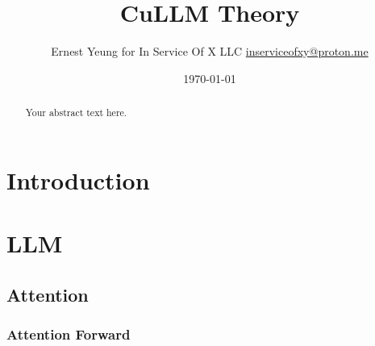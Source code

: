 \documentclass[10pt]{amsart}
\title[CuLLM Theory]{CuLLM Theory}
\author{Ernest Yeung for In Service Of X LLC \href{mailto:inserviceofxy@proton.me}{inserviceofxy@proton.me}}
\date{\today}
\begin{document}

\maketitle
\tableofcontents

\begin{multicols*}{2}

\begin{abstract}
Your abstract text here.
\end{abstract}

\section{Introduction}

\section{LLM}
\subsection{Attention}
\subsubsection{Attention Forward}


\end{multicols*}
\end{document}
